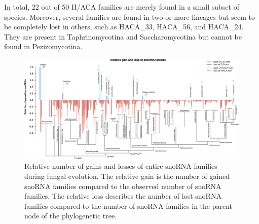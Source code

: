 In total, 22 out of 50 H/ACA families are merely found in a
small subset of species. Moreover, several families are found in two
or more lineages but seem to be completely lost in others, such as HACA\_33,
HACA\_56, and HACA\_24. They are present in Taphrinomycotina and
Saccharomycotina but cannot be found in Pezizomycotina. 


\begin{figure}
  \centering
  \includegraphics[width=\textwidth]{pics/fungi_relative_gain_loss.eps}
  \caption{Relative number of gains and losses of entire snoRNA families during fungal
evolution. The relative gain is the number of gained snoRNA families compared to the
observed number of snoRNA families. The relative loss describes the number of lost
snoRNA families compared to the number of snoRNA families in the parent node of the
phylogenetic tree.}
\label{fig:relative_innovation_deletion_event}
\end{figure}



